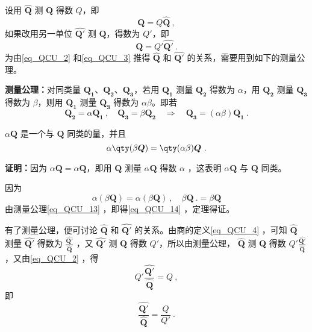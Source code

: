 设用 $\hat{\boldsymbol{Q}}$ 测 $\boldsymbol{Q}$ 得数 $Q$，即
\begin{equation}\label{eq_QCU_2}
\boldsymbol{Q}=Q\hat{\boldsymbol{Q}}~,
\end{equation}
如果改用另一单位 $\hat{\boldsymbol{Q'}}$ 测 $\boldsymbol{Q}$，得数为 $Q'$，即
\begin{equation}\label{eq_QCU_3}
\boldsymbol{Q}=Q'\hat{\boldsymbol{Q'}}~.
\end{equation}
为由\autoref{eq_QCU_2} 和\autoref{eq_QCU_3} 推得 $\hat{\boldsymbol{Q}}$ 和 $\hat{\boldsymbol{Q'}}$ 的关系，需要用到如下的测量公理。

\textbf{测量公理：}对同类量 $\boldsymbol{Q_1}$、$\boldsymbol{Q_2}$、$\boldsymbol{Q_3}$，若用 $\boldsymbol{Q_1}$ 测量 $\boldsymbol{Q_2}$ 得数为 $\alpha$，用 $\boldsymbol{Q_2}$ 测量 $\boldsymbol{Q_3}$ 得数为 $\beta$，则用 $\boldsymbol{Q_1}$ 测量 $\boldsymbol{Q_3}$ 得数为 $\alpha\beta$。即若
\begin{equation}\label{eq_QCU_13}
\boldsymbol{Q_2}=\alpha\boldsymbol{Q_1}~,\quad \boldsymbol{Q_3}=\beta\boldsymbol{Q_2}\quad\Rightarrow \quad\boldsymbol{Q_3}=(\alpha\beta)\boldsymbol{Q_1}~.
\end{equation}

\begin{theorem}{}\label{the_QCU_2}
$\alpha \boldsymbol{Q}$ 是一个与 $\boldsymbol{Q}$ 同类的量，并且
\begin{equation}\label{eq_QCU_14}
\alpha\qty(\beta \boldsymbol{Q})=\qty(\alpha\beta)\boldsymbol Q~.
\end{equation}
\end{theorem}
\textbf{证明：}因为 $\alpha\boldsymbol{Q}=\alpha\boldsymbol{Q}$，即用 $\boldsymbol{Q}$ 测量 $\alpha\boldsymbol{Q}$ 得数 $\alpha$ ，这表明 $\alpha\boldsymbol{Q}$ 与 $\boldsymbol{Q}$ 同类。

因为
\begin{equation}
\alpha(\beta\boldsymbol{Q})=\alpha(\beta\boldsymbol{Q})~,\quad \beta\boldsymbol{Q}~.=\beta\boldsymbol{Q}
\end{equation}
由测量公理\autoref{eq_QCU_13} ，即得\autoref{eq_QCU_14} ，定理得证。

有了测量公理，便可讨论 $\hat{\boldsymbol{Q}}$ 和 $\hat{\boldsymbol{Q'}}$ 的关系。由商的定义\autoref{eq_QCU_4} ，可知 $\hat{\boldsymbol{Q}}$ 测量 $\hat{\boldsymbol{Q'}}$ 得数为 $\frac{\hat{\boldsymbol{Q'}}}{\hat{\boldsymbol{Q}}}$ ，又 $\hat{\boldsymbol{Q'}}$ 测 $\boldsymbol{Q}$ 得数 $Q'$，所以由测量公理， $\hat{\boldsymbol{Q}}$ 测 $\boldsymbol{Q}$ 得数 $Q'\frac{\hat{\boldsymbol{Q'}}}{\hat{\boldsymbol{Q}}}$，又由\autoref{eq_QCU_2} ，得
\begin{equation}
Q'\frac{\hat{\boldsymbol{Q'}}}{\hat{\boldsymbol{Q}}}=Q~,
\end{equation}
即
\begin{equation}\label{eq_QCU_8}
\frac{\hat{\boldsymbol{Q'}}}{\hat{\boldsymbol{Q}}}=\frac{Q}{Q'}~.
\end{equation}

